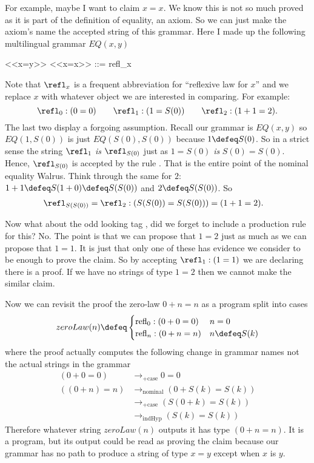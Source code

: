 For example, maybe I want to claim $x=x$.  We know 
this is not so much proved as it is part of the definition of equality, 
an axiom.  So we can just make the axiom's name the accepted 
string of this grammar.  Here I made up the following 
multilingual grammar $EQ(x,y)$
\begin{center}
\begin{Gcode}
<<x=y>>
<<x=x>> ::= refl_x
\end{Gcode}
\end{center}
Note that $\refl_x$ is a frequent abbreviation for ``reflexive law for $x$''
and we replace $x$ with whatever object we are interested in comparing.
For example:
\[
    \refl_0:(0=0)\qquad \refl_{1}:(1=S(0))
    \qquad \refl_{2}:(1+1=2).
\]
The last two display a forgoing assumption.
Recall our grammar is $EQ(x,y)$ so $EQ(1,S(0))$ is just $EQ(S(0),S(0))$ 
because $1\defeq S(0)$.  So in a strict sense
the string $\refl_1$ \emph{is} $\refl_{S(0)}$ just as $1=S(0)$ \emph{is}
$S(0)=S(0)$. Hence, $\refl_{S(0)}$ is accepted by the 
rule .  That is the entire point of the 
nominal equality Walrus.  Think through the same for $2$:
$1+1\defeq S(1+0)\defeq S(S(0))$ and $2\defeq S(S(0))$.  So 
\begin{align*}
    \refl_{S(S(0))} =\refl_2 & : (S(S(0))=S(S(0))) = (1+1=2).
\end{align*}


Now what about the odd looking tag , did we forget 
to include a production rule for this?  No.  The point is that 
we can propose that $1=2$ just as much as we can propose that $1=1$.
It is just that only one of these has evidence we consider to be 
enough to prove the claim.  So by accepting $\refl_1:(1=1)$ we 
are declaring there is a proof.  If we have no strings of type $1=2$ 
then we cannot make the similar claim.

Now we can revisit the proof the zero-law $0+n=n$ as a program 
split into cases
\[
    zeroLaw(n) \defeq \begin{cases}
        \text{refl}_0:(0+0=0) & n=0\\
        \text{refl}_n:(0+n=n) & n\defeq S(k)
    \end{cases}
\]
where the proof actually computes the following change in grammar names
not the actual strings in the grammar
\begin{align*}
    (0+0=0) & \longrightarrow_{+\text{case}} 0=0\\
    ((0+n)=n) & \longrightarrow_{\text{nominal}}  (0+S(k)=S(k))\\
     & \longrightarrow_{+\text{case}} (S(0+k)=S(k))\\
     & \longrightarrow_{\text{indHyp}} (S(k)=S(k))
\end{align*}
Therefore whatever string $zeroLaw(n)$ outputs it has type $(0+n=n)$.
It is a program, but its output could be read as proving the claim because 
our grammar has no path to produce a string of type $x=y$ except when $x$ is $y$.


